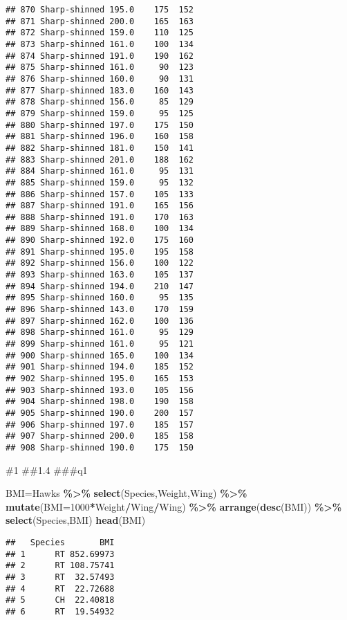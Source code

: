 \documentclass[
]{article}
\newenvironment{Shaded}{\begin{snugshade}}{\end{snugshade}}
\newcommand{\AttributeTok}[1]{\textcolor[rgb]{0.13,0.29,0.53}{#1}}
\newcommand{\DecValTok}[1]{\textcolor[rgb]{0.00,0.00,0.81}{#1}}
\newcommand{\FunctionTok}[1]{\textcolor[rgb]{0.13,0.29,0.53}{\textbf{#1}}}
\newcommand{\NormalTok}[1]{#1}
\newcommand{\OtherTok}[1]{\textcolor[rgb]{0.56,0.35,0.01}{#1}}
\newcommand{\SpecialCharTok}[1]{\textcolor[rgb]{0.81,0.36,0.00}{\textbf{#1}}}
\begin{document}
\begin{verbatim}
## 870 Sharp-shinned 195.0    175  152
## 871 Sharp-shinned 200.0    165  163
## 872 Sharp-shinned 159.0    110  125
## 873 Sharp-shinned 161.0    100  134
## 874 Sharp-shinned 191.0    190  162
## 875 Sharp-shinned 161.0     90  123
## 876 Sharp-shinned 160.0     90  131
## 877 Sharp-shinned 183.0    160  143
## 878 Sharp-shinned 156.0     85  129
## 879 Sharp-shinned 159.0     95  125
## 880 Sharp-shinned 197.0    175  150
## 881 Sharp-shinned 196.0    160  158
## 882 Sharp-shinned 181.0    150  141
## 883 Sharp-shinned 201.0    188  162
## 884 Sharp-shinned 161.0     95  131
## 885 Sharp-shinned 159.0     95  132
## 886 Sharp-shinned 157.0    105  133
## 887 Sharp-shinned 191.0    165  156
## 888 Sharp-shinned 191.0    170  163
## 889 Sharp-shinned 168.0    100  134
## 890 Sharp-shinned 192.0    175  160
## 891 Sharp-shinned 195.0    195  158
## 892 Sharp-shinned 156.0    100  122
## 893 Sharp-shinned 163.0    105  137
## 894 Sharp-shinned 194.0    210  147
## 895 Sharp-shinned 160.0     95  135
## 896 Sharp-shinned 143.0    170  159
## 897 Sharp-shinned 162.0    100  136
## 898 Sharp-shinned 161.0     95  129
## 899 Sharp-shinned 161.0     95  121
## 900 Sharp-shinned 165.0    100  134
## 901 Sharp-shinned 194.0    185  152
## 902 Sharp-shinned 195.0    165  153
## 903 Sharp-shinned 193.0    105  156
## 904 Sharp-shinned 198.0    190  158
## 905 Sharp-shinned 190.0    200  157
## 906 Sharp-shinned 197.0    185  157
## 907 Sharp-shinned 200.0    185  158
## 908 Sharp-shinned 190.0    175  150
\end{verbatim}

\#1 \#\#1.4 \#\#\#q1

\begin{Shaded}
\begin{Highlighting}[]
\NormalTok{BMI}\OtherTok{=}\NormalTok{Hawks }\SpecialCharTok{\%\textgreater{}\%}
  \FunctionTok{select}\NormalTok{(Species,Weight,Wing) }\SpecialCharTok{\%\textgreater{}\%}
  \FunctionTok{mutate}\NormalTok{(}\AttributeTok{BMI=}\DecValTok{1000}\SpecialCharTok{*}\NormalTok{Weight}\SpecialCharTok{/}\NormalTok{Wing}\SpecialCharTok{/}\NormalTok{Wing) }\SpecialCharTok{\%\textgreater{}\%}
  \FunctionTok{arrange}\NormalTok{(}\FunctionTok{desc}\NormalTok{(BMI)) }\SpecialCharTok{\%\textgreater{}\%}
  \FunctionTok{select}\NormalTok{(Species,BMI)}
\FunctionTok{head}\NormalTok{(BMI)}
\end{Highlighting}
\end{Shaded}

\begin{verbatim}
##   Species       BMI
## 1      RT 852.69973
## 2      RT 108.75741
## 3      RT  32.57493
## 4      RT  22.72688
## 5      CH  22.40818
## 6      RT  19.54932
\end{verbatim}
\end{document}
